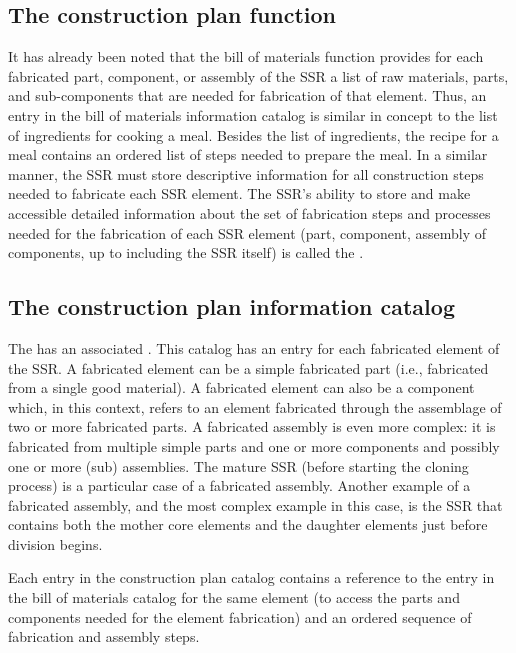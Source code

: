 \subsection[The construction plan function]{The construction plan
function}

It has already been noted that the bill of
materials function provides for each fabricated part, component, or
assembly of the SSR a list of raw materials, parts, and sub-components
that are needed for fabrication of that element. Thus, an entry in the
bill of materials information catalog is similar in concept to the
list of ingredients for cooking a meal. Besides the list of
ingredients, the recipe for a meal contains an ordered list of steps
needed to prepare the meal. In a similar manner, the SSR must store
descriptive information for all construction steps needed to fabricate
each SSR element. The SSR's ability to store and make
accessible detailed information about the set of fabrication steps and
processes needed for the fabrication of each SSR element (part,
component, assembly of components, up to including the SSR itself) is
called the .

\subsection[The construction plan information catalog]{The construction
plan information catalog}

The  has an associated . 
This catalog has an entry for each fabricated element of the
SSR. A fabricated element can be a simple fabricated part (i.e., fabricated
from a single good material). A fabricated element can also be a
component which, in this context, refers to an element fabricated
through the assemblage of two or more fabricated parts. A fabricated
assembly is even more complex: it is fabricated from multiple simple
parts and one or more components and possibly one or more (sub)
assemblies. The mature SSR (before starting the cloning process) is a
particular case of a fabricated assembly. 
Another example of a fabricated assembly, and the most complex example in this case, is the SSR that contains both the mother core elements and the daughter elements just before division begins.


Each entry in the construction plan catalog contains a reference to the entry in the bill of materials catalog for the same element (to access the parts and components needed for the element fabrication) and an ordered sequence of fabrication and assembly steps.

